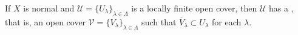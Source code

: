If $X$ is normal and $\mathcal{U} = \{U_{\lambda}\}_{\lambda \in \Lambda}$ is a locally finite open cover, then $\mathcal{U}$ has a , that is, an open cover $\mathcal{V} = \{V_{\lambda}\}_{\lambda \in \Lambda}$ such that $\overline{V}_{\lambda} \subset U_{\lambda}$ for each $\lambda$.

